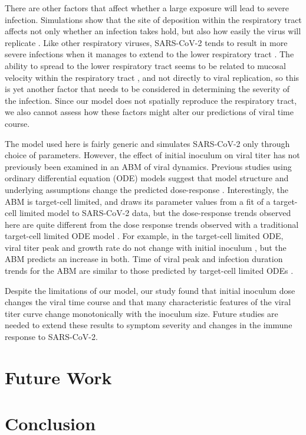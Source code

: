 There are other factors that affect whether a large exposure will lead to severe infection. Simulations show that the site of deposition within the respiratory tract affects not only whether an infection takes hold, but also how easily the virus will replicate \cite{haghnegahdar19}. Like other respiratory viruses, SARS-CoV-2 tends to result in more severe infections when it manages to extend to the lower respiratory tract \cite{COVID20}. The ability to spread to the lower respiratory tract seems to be related to mucosal velocity within the respiratory tract \cite{gonzalez19,quirouette20}, and not directly to viral replication, so this is yet another factor that needs to be considered in determining the severity of the infection. Since our model does not spatially reproduce the respiratory tract, we also cannot assess how these factors might alter our predictions of viral time course.

The model used here is fairly generic and simulates SARS-CoV-2 only through choice of parameters. However, the effect of initial inoculum on viral titer has not previously been examined in an ABM of viral dynamics. Previous studies using ordinary differential equation (ODE) models suggest that model structure and underlying assumptions change the predicted dose-response \cite{wethington19, li14}. Interestingly, the ABM is target-cell limited, and draws its parameter values from a fit of a target-cell limited model to SARS-CoV-2 data, but the dose-response trends observed here are quite different from the dose response trends observed with a traditional target-cell limited ODE model \cite{wethington19,li14}. For example, in the target-cell limited ODE, viral titer peak and growth rate do not change with initial inoculum \cite{wethington19, li14}, but the ABM predicts an increase in both. Time of viral peak and infection duration trends for the ABM are similar to those predicted by target-cell limited ODEs \cite{wethington19, li14}.

Despite the limitations of our model, our study found that initial inoculum dose changes the viral time course and that many characteristic features of the viral titer curve change monotonically with the inoculum size. Future studies are needed to extend these results to symptom severity and changes in the immune response to SARS-CoV-2.

\section{Future Work}
\section{Conclusion}

